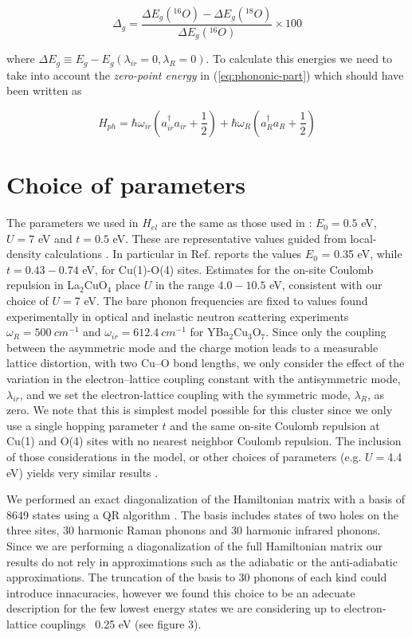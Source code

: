 \begin{equation}\label{eq:isot-shift-def-grd}
\Delta_g = \frac{\Delta E_g(^{16}O)- \Delta E_g(^{18}O)}{\Delta E_g(^{16}O)} \times 100
\end{equation}

where $\Delta E_g \equiv E_g - E_g(\lambda_{ir}=0, \lambda_R=0)$. To calculate this energies we need to take into account the \textit{zero-point energy} in (\ref{eq:phononic-part}) which should have been written as 

\begin{equation}\label{eq:phononic-part-complete}
H_{ph} = \hbar \omega_{ir} \left( a_{ir}^\dagger a_{ir} + \frac{1}{2}\right) + \hbar \omega_R\left( a_R^\dagger a_R + \frac{1}{2} \right)
\end{equation}


\section{Choice of parameters}

The parameters we used in $H_{el}$  are the same as those used in \cite{Mena2006}: $E_0=0.5$ eV, $U=7$ eV and $t=0.5$ eV. These are representative values guided from local-density calculations \cite{Pickett1989}. In particular in Ref. \cite{DeWeert1989} reports the values $E_0$ = 0.35 eV, while $t=0.43-0.74$ eV, for Cu(1)-O(4) sites. Estimates for the on-site Coulomb repulsion in La$_2$CuO$_4$ place $U$ in the range $4.0-10.5$ eV, \cite{Hybertsen1989} consistent with our choice of $U=$7 eV.  The bare phonon frequencies are fixed to values found experimentally in optical and inelastic neutron scattering experiments $\omega_R = 500\ cm^{-1}$ and $\omega_{ir} = 612.4\ cm^{-1}$ for YBa$_2$Cu$_3$O$_7$. Since only the coupling between the asymmetric mode and the charge motion leads to a measurable lattice distortion, with two Cu–O bond lengths, we only consider the effect of the variation in the electron–lattice coupling constant with the antisymmetric mode, $\lambda_{ir}$,  and we set the electron-lattice coupling with the symmetric mode, $\lambda_R$, as zero. We note that this is simplest model possible for this cluster since we only use a single hopping parameter $t$ and the same on-site Coulomb repulsion at Cu(1) and O(4) sites with no nearest neighbor Coulomb repulsion. The inclusion of those considerations in the model, or other choices of parameters (e.g. $U = $4.4 eV) yields very similar results \cite{Salkola1994}.

We performed an exact diagonalization of the Hamiltonian matrix with a basis of 8649 states using a QR algorithm \cite{eigenweb}. The basis includes states of two holes on the three sites, 30 harmonic Raman phonons and 30 harmonic infrared phonons. Since we are performing a diagonalization of the full Hamiltonian matrix our results do not rely in approximations such as the adiabatic or the anti-adiabatic approximations. The  truncation of the basis to 30 phonons of each kind could introduce innacuracies, however we found this choice to be an adecuate description for the few lowest energy states we are considering up to electron-lattice couplings ~0.25 eV (see figure 3).

